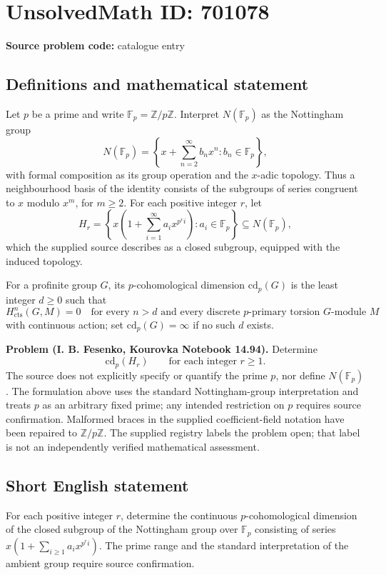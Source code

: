 \documentclass[11pt]{article}
\newcommand{\Z}{\mathbb{Z}}
\newcommand{\F}{\mathbb{F}}
\begin{document}
\section*{UnsolvedMath ID: 701078}
\textbf{Source problem code:} catalogue entry
\subsection{Definitions and mathematical statement}
Let \(p\) be a prime and write \(\F_p=\Z/p\Z\). Interpret \(N(\F_p)\) as the Nottingham group
\[
N(\F_p)=\left\{x+\sum_{n=2}^{\infty}b_nx^n:b_n\in\F_p\right\},
\]
with formal composition as its group operation and the \(x\)-adic topology. Thus a neighbourhood basis of the identity consists of the subgroups of series congruent to \(x\) modulo \(x^m\), for \(m\geq2\). For each positive integer \(r\), let
\[
H_r=\left\{x\left(1+\sum_{i=1}^{\infty}a_i x^{p^r i}\right):a_i\in\F_p\right\}\subseteq N(\F_p),
\]
which the supplied source describes as a closed subgroup, equipped with the induced topology.

For a profinite group \(G\), its \(p\)-cohomological dimension \(\mathrm{cd}_p(G)\) is the least integer \(d\geq0\) such that
\[
H^n_{\mathrm{cts}}(G,M)=0
\quad\text{for every }n>d\text{ and every discrete }p\text{-primary torsion }G\text{-module }M
\]
with continuous action; set \(\mathrm{cd}_p(G)=\infty\) if no such \(d\) exists.

\textbf{Problem (I. B. Fesenko, Kourovka Notebook 14.94).} Determine
\[
\mathrm{cd}_p(H_r)
\qquad\text{for each integer }r\geq1.
\]
The source does not explicitly specify or quantify the prime \(p\), nor define \(N(\F_p)\). The formulation above uses the standard Nottingham-group interpretation and treats \(p\) as an arbitrary fixed prime; any intended restriction on \(p\) requires source confirmation. Malformed braces in the supplied coefficient-field notation have been repaired to \(\Z/p\Z\). The supplied registry labels the problem open; that label is not an independently verified mathematical assessment.
\subsection{Short English statement}
For each positive integer \(r\), determine the continuous \(p\)-cohomological dimension of the closed subgroup of the Nottingham group over \(\F_p\) consisting of series \(x(1+\sum_{i\geq1}a_i x^{p^r i})\). The prime range and the standard interpretation of the ambient group require source confirmation.
\end{document}
